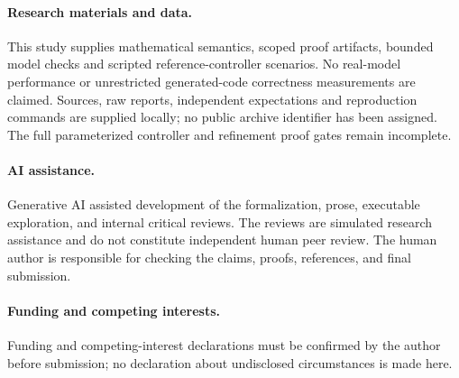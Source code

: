 \documentclass[pdflatex,sn-mathphys-num]{sn-jnl}
\theoremstyle{thmstyleone}
\theoremstyle{thmstylethree}
\theoremstyle{thmstyletwo}
\begin{document}
\paragraph{Research materials and data.} This study supplies mathematical semantics, scoped proof artifacts, bounded model checks and scripted reference-controller scenarios. No real-model performance or unrestricted generated-code correctness measurements are claimed. Sources, raw reports, independent expectations and reproduction commands are supplied locally; no public archive identifier has been assigned. The full parameterized controller and refinement proof gates remain incomplete.
\paragraph{AI assistance.} Generative AI assisted development of the formalization, prose, executable exploration, and internal critical reviews. The reviews are simulated research assistance and do not constitute independent human peer review. The human author is responsible for checking the claims, proofs, references, and final submission.
\paragraph{Funding and competing interests.} Funding and competing-interest declarations must be confirmed by the author before submission; no declaration about undisclosed circumstances is made here.

\begingroup
\setlength{\bibsep}{0.5em}

\endgroup
\end{document}
